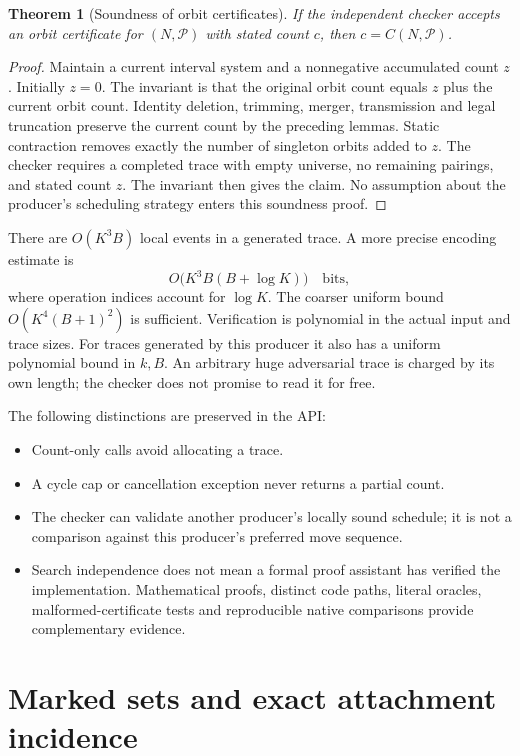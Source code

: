 \documentclass[11pt,a4paper]{article}
\newtheorem{theorem}{Theorem}[section]
\theoremstyle{definition}\newtheorem{definition}[theorem]{Definition}
\theoremstyle{remark}\newtheorem{remark}[theorem]{Remark}
\begin{document}
\begin{theorem}[Soundness of orbit certificates]
If the independent checker accepts an orbit certificate for
$(N,\mathcal P)$ with stated count $c$, then $c=C(N,\mathcal P)$.
\end{theorem}
\begin{proof}
Maintain a current interval system and a nonnegative accumulated count $z$.
Initially $z=0$. The invariant is that the original orbit count equals $z$
plus the current orbit count. Identity deletion, trimming, merger,
transmission and legal truncation preserve the current count by the preceding
lemmas. Static contraction removes exactly the number of singleton orbits
added to $z$. The checker requires a completed trace with empty universe,
no remaining pairings, and stated count $z$. The invariant then gives the
claim. No assumption about the producer's scheduling strategy enters this
soundness proof.
\end{proof}

There are $O(K^3B)$ local events in a generated trace. A more precise
encoding estimate is
\[
 O\bigl(K^3B(B+\log K)\bigr)\quad\text{bits},
\]
where operation indices account for $\log K$. The coarser uniform bound
$O(K^4(B+1)^2)$ is sufficient. Verification is polynomial in the actual
input and trace sizes. For traces generated by this producer it also has a
uniform polynomial bound in $k,B$. An arbitrary huge adversarial trace is
charged by its own length; the checker does not promise to read it for free.

The following distinctions are preserved in the API:
\begin{itemize}
\item Count-only calls avoid allocating a trace.
\item A cycle cap or cancellation exception never returns a partial count.
\item The checker can validate another producer's locally sound schedule;
it is not a comparison against this producer's preferred move sequence.
\item Search independence does not mean a formal proof assistant has
verified the implementation. Mathematical proofs, distinct code paths,
literal oracles, malformed-certificate tests and reproducible native
comparisons provide complementary evidence.
\end{itemize}

\section{Marked sets and exact attachment incidence}
\label{sec:ports}
\end{document}
